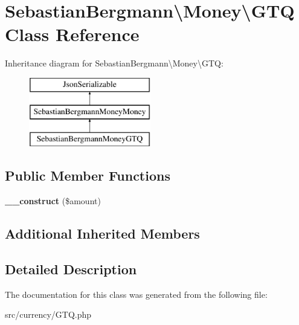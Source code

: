 \hypertarget{classSebastianBergmann_1_1Money_1_1GTQ}{}\section{Sebastian\+Bergmann\textbackslash{}Money\textbackslash{}G\+T\+Q Class Reference}
\label{classSebastianBergmann_1_1Money_1_1GTQ}
Inheritance diagram for Sebastian\+Bergmann\textbackslash{}Money\textbackslash{}G\+T\+Q\+:\begin{figure}[H]
\begin{center}
\leavevmode
\includegraphics[height=3.000000cm]{classSebastianBergmann_1_1Money_1_1GTQ}
\end{center}
\end{figure}
\subsection*{Public Member Functions}
\begin{DoxyCompactItemize}
\item 
\hypertarget{classSebastianBergmann_1_1Money_1_1GTQ_afcf1ec54a66c383e3bf8201e00a0e695}{}{\bfseries \+\_\+\+\_\+construct} (\$amount)\label{classSebastianBergmann_1_1Money_1_1GTQ_afcf1ec54a66c383e3bf8201e00a0e695}

\end{DoxyCompactItemize}
\subsection*{Additional Inherited Members}


\subsection{Detailed Description}


The documentation for this class was generated from the following file\+:\begin{DoxyCompactItemize}
\item 
src/currency/G\+T\+Q.\+php\end{DoxyCompactItemize}
